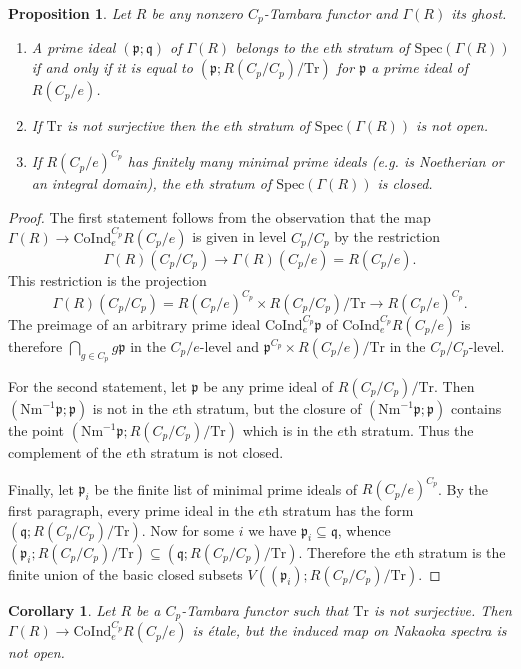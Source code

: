 \documentclass[11pt,dvipsnames]{amsart}
\newcommand{\p}{\mathfrak{p}}
\newcommand{\q}{\mathfrak{q}}
\newtheorem{proposition}[theorem]{Proposition}
\newtheorem{corollary}[theorem]{Corollary}
\theoremstyle{BoldRemark}
\newcommand{\Spec}{\mathrm{Spec}}
\newcommand{\Nm}{\mathrm{Nm}}
\newcommand{\Coind}{\mathrm{CoInd}}
\newcommand{\Tr}{\mathrm{Tr}}
\renewcommand{\subset}{\subseteq}
\newcommand{\ghost}{\Gamma}
\begin{document}
\begin{proposition}\label{prop:stratum-of-ghost}
    Let $R$ be any nonzero $C_p$-Tambara functor and $\ghost(R)$ its ghost. 
    \begin{enumerate}
        \item A prime ideal $(\p;\q)$ of $\ghost(R)$ belongs to the $e$th stratum of $\Spec(\ghost(R))$ if and only if it is equal to $(\p;R(C_p/C_p)/\Tr)$ for $\p$ a prime ideal of $R(C_p/e)$.
        \item If $\Tr$ is not surjective then the $e$th stratum of $\Spec(\ghost(R))$ is not open.
        \item If $R(C_p/e)^{C_p}$ has finitely many minimal prime ideals (e.g. is Noetherian or an integral domain), the $e$th stratum of $\Spec(\ghost(R))$ is closed.
    \end{enumerate}
\end{proposition}

\begin{proof}
    The first statement follows from the observation that the map $\ghost(R) \rightarrow \Coind_e^{C_p} R(C_p/e)$ is given in level $C_p/C_p$ by the restriction 
    \[ 
        \ghost(R)(C_p/C_p) \rightarrow \ghost(R)(C_p/e) = R(C_p/e) . 
    \] 
    This restriction is the projection 
    \[ 
        \ghost(R)(C_p/C_p) = R(C_p/e)^{C_p} \times R(C_p/C_p)/\Tr \rightarrow R(C_p/e)^{C_p} . 
    \] 
    The preimage of an arbitrary prime ideal $\Coind_e^{C_p} \p$ of $\Coind_e^{C_p} R(C_p/e)$ is therefore $\bigcap_{g \in C_p} g \p$ in the $C_p/e$-level and $\p^{C_p} \times R(C_p/e)/\Tr$ in the $C_p/C_p$-level.

    For the second statement, let $\p$ be any prime ideal of $R(C_p/C_p)/\Tr$. Then $(\Nm^{-1}\p;\p)$ is not in the $e$th stratum, but the closure of $(\Nm^{-1}\p;\p)$ contains the point $(\Nm^{-1}\p;R(C_p/C_p)/\Tr)$ which is in the $e$th stratum. Thus the complement of the $e$th stratum is not closed.

    Finally, let $\p_i$ be the finite list of minimal prime ideals of $R(C_p/e)^{C_p}$. By the first paragraph, every prime ideal in the $e$th stratum has the form $(\q;R(C_p/C_p)/\Tr)$. Now for some $i$ we have $\p_i \subset \q$, whence $(\p_i;R(C_p/C_p)/\Tr) \subset (\q;R(C_p/C_p)/\Tr)$. Therefore the $e$th stratum is the finite union of the basic closed subsets $V((\p_i);R(C_p/C_p)/\Tr)$.
\end{proof}

\begin{corollary}\label{cor:ghost-strata-are-usually-not-open}
    Let $R$ be a $C_p$-Tambara functor such that $\Tr$ is not surjective. Then $\ghost(R) \rightarrow \Coind_e^{C_p} R(C_p/e)$ is \'{e}tale, but the induced map on Nakaoka spectra is not open.
\end{corollary}
\end{document}
